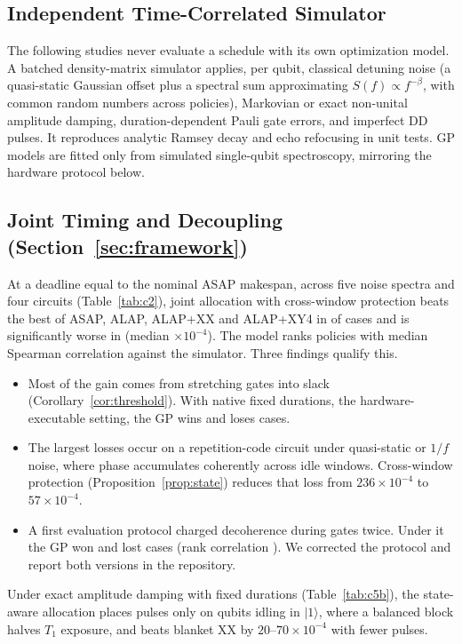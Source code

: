 \documentclass[10pt,letterpaper,journal]{IEEEtran}
\begin{document}
\subsection{Independent Time-Correlated Simulator}
The following studies never evaluate a schedule with its own optimization model. A batched density-matrix simulator applies, per qubit, classical detuning noise (a quasi-static Gaussian offset plus a spectral sum approximating $S(f)\propto f^{-\beta}$, with common random numbers across policies), Markovian or exact non-unital amplitude damping, duration-dependent Pauli gate errors, and imperfect DD pulses. It reproduces analytic Ramsey decay and echo refocusing in unit tests. GP models are fitted only from simulated single-qubit spectroscopy, mirroring the hardware protocol below.

\subsection{Joint Timing and Decoupling (Section~\ref{sec:framework})}
At a deadline equal to the nominal ASAP makespan, across five noise spectra and four circuits (Table~\ref{tab:c2}), joint allocation with cross-window protection beats the best of ASAP, ALAP, ALAP+XX and ALAP+XY4 in \CTwoWins{} of \CTwoCases{} cases and is significantly worse in \CTwoLosses{} (median \CTwoMedian$\times10^{-4}$). The model ranks policies with median Spearman correlation \CTwoRank{} against the simulator. Three findings qualify this.
\begin{itemize}
\item Most of the gain comes from stretching gates into slack (Corollary~\ref{cor:threshold}). With native fixed durations, the hardware-executable setting, the GP wins \CTwoFixedWins{} and loses \CTwoFixedLosses{} cases.
\item The largest losses occur on a repetition-code circuit under quasi-static or $1/f$ noise, where phase accumulates coherently across idle windows. Cross-window protection (Proposition~\ref{prop:state}) reduces that loss from $236\times10^{-4}$ to $57\times10^{-4}$.
\item A first evaluation protocol charged decoherence during gates twice. Under it the GP won \CTwoVoneWins{} and lost \CTwoVoneLosses{} cases (rank correlation \CTwoVoneRank{}). We corrected the protocol and report both versions in the repository.
\end{itemize}


Under exact amplitude damping with fixed durations (Table~\ref{tab:c5b}), the state-aware allocation places pulses only on qubits idling in $|1\rangle$, where a balanced block halves $T_1$ exposure, and beats blanket XX by $20$--$70\times10^{-4}$ with fewer pulses.
\end{document}
